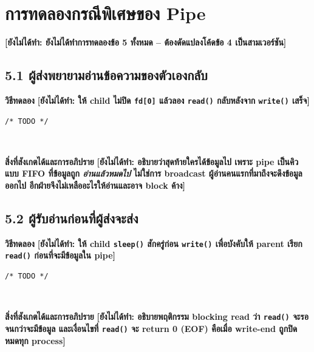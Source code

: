\documentclass[a4paper,12pt]{article}
\newcommand{\code}[1]{\texttt{#1}}
\newcommand{\todo}[1]{\textcolor{todored}{\textbf{[ยังไม่ได้ทำ: #1]}}}
\begin{document}
\section{การทดลองกรณีพิเศษของ Pipe}

\todo{ยังไม่ได้ทำการทดลองข้อ 5 ทั้งหมด -- ต้องดัดแปลงโค้ดข้อ 4 เป็นสามเวอร์ชัน}

\subsection{5.1 ผู้ส่งพยายามอ่านข้อความของตัวเองกลับ}

\textbf{วิธีทดลอง} \quad \todo{ให้ child ไม่ปิด \code{fd[0]} แล้วลอง \code{read()}
กลับหลังจาก \code{write()} เสร็จ}

\begin{lstlisting}[caption={ส่วนของโค้ดที่แก้ไขในข้อ 5.1}]
/* TODO */
\end{lstlisting}

\begin{lstlisting}[style=terminal,caption={ผลลัพธ์ของข้อ 5.1}]


\end{lstlisting}

\textbf{สิ่งที่สังเกตได้และการอภิปราย} \quad \todo{อธิบายว่าสุดท้ายใครได้ข้อมูลไป
เพราะ pipe เป็นคิวแบบ FIFO ที่ข้อมูลถูก \emph{อ่านแล้วหมดไป} ไม่ใช่การ broadcast
ผู้อ่านคนแรกที่มาถึงจะดึงข้อมูลออกไป อีกฝ่ายจึงไม่เหลืออะไรให้อ่านและอาจ block ค้าง}

\subsection{5.2 ผู้รับอ่านก่อนที่ผู้ส่งจะส่ง}

\textbf{วิธีทดลอง} \quad \todo{ให้ child \code{sleep()} สักครู่ก่อน \code{write()}
เพื่อบังคับให้ parent เรียก \code{read()} ก่อนที่จะมีข้อมูลใน pipe}

\begin{lstlisting}[caption={ส่วนของโค้ดที่แก้ไขในข้อ 5.2}]
/* TODO */
\end{lstlisting}

\begin{lstlisting}[style=terminal,caption={ผลลัพธ์ของข้อ 5.2}]


\end{lstlisting}

\textbf{สิ่งที่สังเกตได้และการอภิปราย} \quad \todo{อธิบายพฤติกรรม blocking read
ว่า \code{read()} จะรอจนกว่าจะมีข้อมูล และเงื่อนไขที่ \code{read()} จะ return 0 (EOF)
คือเมื่อ write-end ถูกปิดหมดทุก process}
\end{document}
